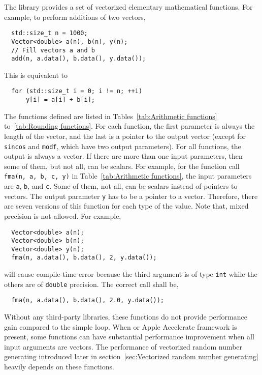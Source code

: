 The library provides a set of vectorized elementary mathematical functions.
For example, to perform additions of two vectors,
\begin{Verbatim}
  std::size_t n = 1000;
  Vector<double> a(n), b(n), y(n);
  // Fill vectors a and b
  add(n, a.data(), b.data(), y.data());
\end{Verbatim}
This is equivalent to
\begin{Verbatim}
  for (std::size_t i = 0; i != n; ++i)
      y[i] = a[i] + b[i];
\end{Verbatim}
The functions defined are listed in Tables~\ref{tab:Arithmetic functions}
to~\ref{tab:Rounding functions}. For each function, the first parameter is
always the length of the vector, and the last is a pointer to the output vector
(except for \verb|sincos| and \verb|modf|, which have two output parameters).
For all functions, the output is always a vector. If there are more than one
input parameters, then some of them, but not all, can be scalars. For example,
for the function call \verb|fma(n, a, b, c, y)| in Table~\ref{tab:Arithmetic
  functions}, the input parameters are \verb|a|, \verb|b|, and \verb|c|. Some
of them, not all, can be scalars instead of pointers to vectors. The output
parameter \verb|y| has to be a pointer to a vector. Therefore, there are seven
versions of this function for each type of the value. Note that, mixed
precision is not allowed. For example,
\begin{Verbatim}
  Vector<double> a(n);
  Vector<double> b(n);
  Vector<double> y(n);
  fma(n, a.data(), b.data(), 2, y.data());
\end{Verbatim}
will cause compile-time error because the third argument is of type \verb|int|
while the others are of \verb|double| precision. The correct call shall be,
\begin{Verbatim}
  fma(n, a.data(), b.data(), 2.0, y.data());
\end{Verbatim}
Without any third-party libraries, these functions do not provide performance
gain compared to the simple loop. When \mkl or Apple Accelerate framework is
present, some functions can have substantial performance improvement when all
input arguments are vectors. The performance of vectorized random number
generating introduced later in section~\ref{sec:Vectorized random number
  generating} heavily depends on these functions.

